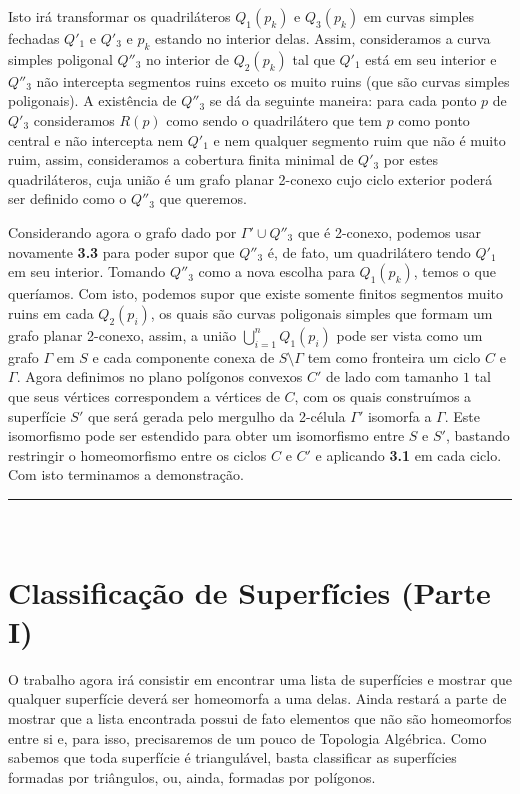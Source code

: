 \documentclass[12pt,a4paper]{article}
\def\eop{\hfill\rule{2.5mm}{2.5mm} \\ }
\theoremstyle{definition}
\begin{document}
Isto irá transformar os quadriláteros $Q_1(p_k)$ e $Q_3(p_k)$ em curvas simples fechadas $Q'_1$ e $Q'_3$ e $p_k$ estando no interior delas. Assim, consideramos a curva simples poligonal $Q''_3$ no interior de $Q_2(p_k)$ tal que $Q'_1$ está em seu interior e $Q''_3$ não intercepta segmentos ruins exceto os muito ruins (que são curvas simples poligonais). A existência de $Q''_3$ se dá da seguinte maneira: para cada ponto $p$ de $Q'_3$ consideramos $R(p)$ como sendo o quadrilátero que tem $p$ como ponto central e não intercepta nem $Q'_1$ e nem qualquer segmento ruim que não é muito ruim, assim, consideramos a cobertura finita minimal de $Q'_3$ por estes quadriláteros, cuja união é um grafo planar 2-conexo cujo ciclo exterior poderá ser definido como o $Q''_3$ que queremos.

Considerando agora o grafo dado por $\Gamma'\cup Q''_3$ que é 2-conexo, podemos usar novamente \textbf{3.3} para poder supor que $Q''_3$ é, de fato, um quadrilátero tendo $Q'_1$ em seu interior. Tomando $Q''_3$ como a nova escolha para $Q_1(p_k)$, temos o que queríamos. Com isto, podemos supor que existe somente finitos segmentos muito ruins em cada $Q_2(p_i)$, os quais são curvas poligonais simples que formam um grafo planar 2-conexo, assim, a união $\bigcup_{i=1}^{n}Q_1(p_i)$ pode ser vista como um grafo $\Gamma$ em $S$ e cada componente conexa de $S\setminus \Gamma$ tem como fronteira um ciclo $C$ e $\Gamma$. Agora definimos no plano polígonos convexos $C'$ de lado com tamanho $1$ tal que seus vértices correspondem a vértices de $C$, com os quais construímos a superfície $S'$ que será gerada pelo mergulho da 2-célula $\Gamma'$ isomorfa a $\Gamma$. Este isomorfismo pode ser estendido para obter um isomorfismo entre $S$ e $S'$, bastando restringir o homeomorfismo entre os ciclos $C$ e $C'$ e aplicando \textbf{3.1} em cada ciclo. Com isto terminamos a demonstração. \eop

\section{Classificação de Superfícies (Parte I)}

O trabalho agora irá consistir em encontrar uma lista de superfícies e mostrar que qualquer superfície deverá ser homeomorfa a uma delas. Ainda restará a parte de mostrar que a lista encontrada possui de fato elementos que não são homeomorfos entre si e, para isso, precisaremos de um pouco de Topologia Algébrica. Como sabemos que toda superfície é triangulável, basta classificar as superfícies formadas por triângulos, ou, ainda, formadas por polígonos. 
\end{document}
